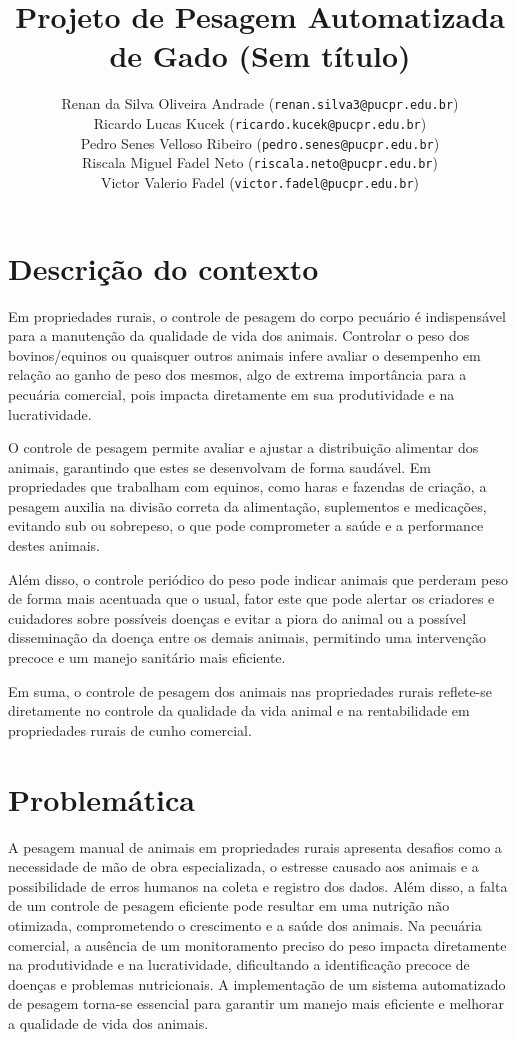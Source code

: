 \documentclass[11pt]{article}
\title{\textbf{Projeto de Pesagem Automatizada de Gado (Sem título)}}
\author{
    Renan da Silva Oliveira Andrade (\texttt{renan.silva3@pucpr.edu.br})\\
    Ricardo Lucas Kucek (\texttt{ricardo.kucek@pucpr.edu.br})\\
    Pedro Senes Velloso Ribeiro (\texttt{pedro.senes@pucpr.edu.br})\\ 
    Riscala Miguel Fadel Neto (\texttt{riscala.neto@pucpr.edu.br})\\ Victor Valerio Fadel (\texttt{victor.fadel@pucpr.edu.br})
}
\begin{document}
\maketitle

\section{Descrição do contexto}

Em propriedades rurais, o controle de pesagem do corpo pecuário é indispensável para a manutenção da qualidade de vida dos animais. Controlar o peso dos bovinos/equinos ou quaisquer outros animais infere avaliar o desempenho em relação ao ganho de peso dos mesmos, algo de extrema importância para a pecuária comercial, pois impacta diretamente em sua produtividade e na lucratividade.

O controle de pesagem permite avaliar e ajustar a distribuição alimentar dos animais, garantindo que estes se desenvolvam de forma saudável. Em propriedades que trabalham com equinos, como haras e fazendas de criação, a pesagem auxilia na divisão correta da alimentação, suplementos e medicações, evitando sub ou sobrepeso, o que pode comprometer a saúde e a performance destes animais.

Além disso, o controle periódico do peso pode indicar animais que perderam peso de forma mais acentuada que o usual, fator este que pode alertar os criadores e cuidadores sobre possíveis doenças e evitar a piora do animal ou a possível disseminação da doença entre os demais animais, permitindo uma intervenção precoce e um manejo sanitário mais eficiente.

Em suma, o controle de pesagem dos animais nas propriedades rurais reflete-se diretamente no controle da qualidade da vida animal e na rentabilidade em propriedades rurais de cunho comercial.

\section{Problemática}
A pesagem manual de animais em propriedades rurais apresenta desafios como a necessidade de mão de obra especializada,
o estresse causado aos animais e a possibilidade de erros humanos na coleta e registro dos dados.
Além disso, a falta de um controle de pesagem eficiente pode resultar em uma nutrição não otimizada,
comprometendo o crescimento e a saúde dos animais. Na pecuária comercial,
a ausência de um monitoramento preciso do peso impacta diretamente na produtividade e na lucratividade,
dificultando a identificação precoce de doenças e problemas nutricionais.
A implementação de um sistema automatizado de pesagem torna-se essencial para garantir um manejo mais eficiente e melhorar a qualidade de vida dos animais.
\end{document}
